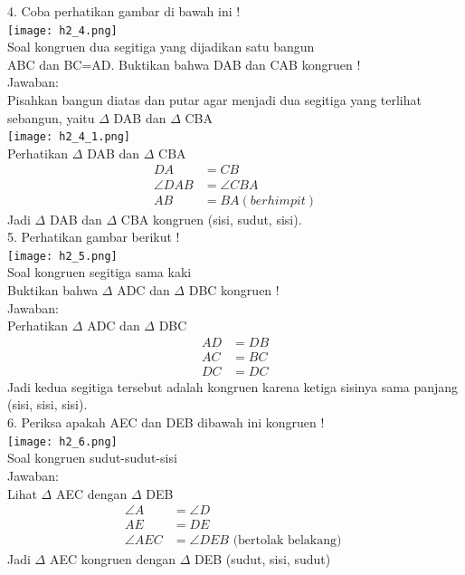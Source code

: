 \documentclass[11pt,fleqn]{book} %
\begin{document}
4. Coba perhatikan gambar di bawah ini !\\
\texttt{[image: h2\_4.png]}\\
Soal kongruen dua segitiga yang dijadikan satu bangun\\
ABC dan BC=AD. Buktikan bahwa DAB dan CAB kongruen !\\

Jawaban:\\
Pisahkan bangun diatas dan putar agar menjadi dua segitiga yang terlihat sebangun, yaitu $\Delta$ DAB dan $\Delta$ CBA\\
\texttt{[image: h2\_4\_1.png]}\\

Perhatikan $\Delta$ DAB dan $\Delta$ CBA\\
    \begin{align*} DA &= CB \\ \angle DAB &= \angle CBA \\ AB &= BA (berhimpit) \end{align*}
Jadi $\Delta$ DAB dan $\Delta$ CBA kongruen (sisi, sudut, sisi).\\


5. Perhatikan gambar berikut !\\
\texttt{[image: h2\_5.png]}\\
Soal kongruen segitiga sama kaki\\
Buktikan bahwa $\Delta$ ADC dan $\Delta$ DBC kongruen !\\

Jawaban:\\
Perhatikan $\Delta$ ADC dan $\Delta$ DBC\\
    \begin{align*} AD &= DB \\ AC &= BC \\ DC &= DC \end{align*}
Jadi kedua segitiga tersebut adalah kongruen karena ketiga sisinya sama panjang (sisi, sisi, sisi).\\


6. Periksa apakah  AEC dan  DEB dibawah ini kongruen !\\
\texttt{[image: h2\_6.png]}\\
Soal kongruen sudut-sudut-sisi\\

Jawaban:\\
Lihat $\Delta$ AEC dengan $\Delta$ DEB\\
    \begin{align*} \angle A &= \angle D \\ AE &= DE \\ \angle AEC &= \angle DEB \text{ (bertolak belakang) } \end{align*}
Jadi $\Delta$ AEC kongruen dengan $\Delta$ DEB (sudut, sisi, sudut)\\
\end{document}

